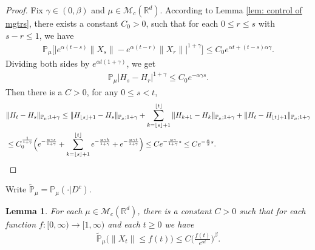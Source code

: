 \documentclass[12pt,oneside,english]{amsart}
\theoremstyle{plain}
\newtheorem{lem}[thm]{Lemma}
\theoremstyle{definition}
\numberwithin{equation}{section}
\begin{document}
\begin{proof}
     Fix $\gamma \in (0,\beta)$ and $\mu\in \mathcal M_c(\mathbb R^d)$.
 According to Lemma \ref{lem: control of mgtrs}, there exists a constant $C_0>0$, such that for each $0\leq r\leq s $ with $s-r\leq1$, we have
    \begin{align}
        \mathbb{P}_{\mu}\big[\big|e^{\alpha(t-s)}\|X_s\|-e^{\alpha(t-r)}\|X_r\|\big|^{1+\gamma}\big]
        \leq C_0e^{\alpha t+(t-s)\alpha\gamma}.
    \end{align}
    Dividing both sides by $e^{\alpha t(1+\gamma)}$, we get
    \begin{align}
        \mathbb{P}_{\mu}\left|H_s-H_r\right|^{1+\gamma}\leq  C_0 e^{-\alpha \gamma s}.
    \end{align}
    Then there is a $C>0$, for any $0\leq s<t$,
\begin{align}
	& \|H_t-H_s\|_{\mathbb{P}_{\mu};1+\gamma}
	\leq \|H_{\lfloor s \rfloor+1}-H_s\|_{\mathbb{P}_{\mu};1+\gamma}+\sum_{k=\lfloor s \rfloor+1}^{\lfloor t \rfloor}\|H_{k+1}-H_{k}\|_{\mathbb{P}_{\mu};1+\gamma}+\|H_t-H_{\lfloor t \rfloor+1}\|_{\mathbb{P}_{\mu};1+\gamma}
	\\& \leq C_0^{\frac{1}{1+\gamma}} \Big(e^{-\frac{\alpha \gamma s}{1+\gamma}}+\sum_{k=\lfloor s \rfloor+1}^{\lfloor t \rfloor}e^{-\frac{\alpha \gamma k}{1+\gamma}}+ e^{-\frac{\alpha \gamma t}{1+\gamma}}\Big)
	\leq Ce^{-\frac{\alpha \gamma}{1+\gamma}s}\leq Ce^{-\frac{\alpha}{2}s}.
    \qedhere
\end{align}	
\end{proof}

Write $\mathbb{\tilde{P}}_{\mu}=\mathbb{P}_{\mu}(\cdot|D^c)$.
\begin{lem}\label{lem: control of XT}
	For each $\mu\in \mathcal M_c(\mathbb R^d)$, there is a constant $C>0$ such that for each function $f:[0,\infty)\to [1,\infty)$ and each $t\geq 0$ we have
\begin{align}
    \mathbb{\tilde{P}}_{\mu}\big(\|X_t\|\leq f(t)\big)\leq C \Big(\frac{f(t)}{e^{\alpha t}}\Big)^{\beta}.
\end{align}
\end{lem}
\end{document}
